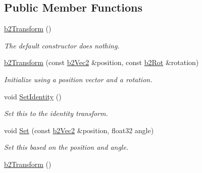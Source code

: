 \subsection*{Public Member Functions}
\begin{DoxyCompactItemize}
\item 
\mbox{\label{structb2Transform_a765a2e5c692a2e1d05c7a5441019373d}} 
\hyperlink{structb2Transform_a765a2e5c692a2e1d05c7a5441019373d}{b2\+Transform} ()
\begin{DoxyCompactList}\small\item\em The default constructor does nothing. \end{DoxyCompactList}\item 
\mbox{\label{structb2Transform_a823e190e4810e35e8100f4414d0bef62}} 
\hyperlink{structb2Transform_a823e190e4810e35e8100f4414d0bef62}{b2\+Transform} (const \hyperlink{structb2Vec2}{b2\+Vec2} \&position, const \hyperlink{structb2Rot}{b2\+Rot} \&rotation)
\begin{DoxyCompactList}\small\item\em Initialize using a position vector and a rotation. \end{DoxyCompactList}\item 
\mbox{\label{structb2Transform_af92af4ec6833552b1b22a6ca6d4f5644}} 
void \hyperlink{structb2Transform_af92af4ec6833552b1b22a6ca6d4f5644}{Set\+Identity} ()
\begin{DoxyCompactList}\small\item\em Set this to the identity transform. \end{DoxyCompactList}\item 
\mbox{\label{structb2Transform_a4db696a0b3fada95f95cde3e7e85ced9}} 
void \hyperlink{structb2Transform_a4db696a0b3fada95f95cde3e7e85ced9}{Set} (const \hyperlink{structb2Vec2}{b2\+Vec2} \&position, float32 angle)
\begin{DoxyCompactList}\small\item\em Set this based on the position and angle. \end{DoxyCompactList}\item 
\mbox{\label{structb2Transform_a765a2e5c692a2e1d05c7a5441019373d}} 
\hyperlink{structb2Transform_a765a2e5c692a2e1d05c7a5441019373d}{b2\+Transform} ()

\end{DoxyCompactItemize}
